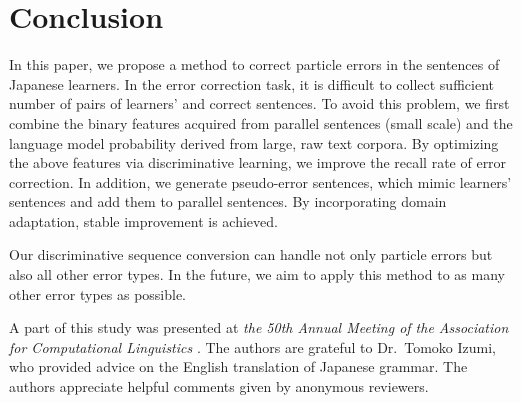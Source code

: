 \documentclass[english]{jnlp_1.4_rep}
\begin{document}
\section{Conclusion}
\label{sec-conclusion}

In this paper, we propose a method to correct particle errors in the
sentences of Japanese learners. In the error correction task, it is
difficult to collect sufficient number of pairs of learners' and
correct sentences. To avoid this problem, we first combine the binary
features acquired from parallel sentences (small scale) and the
language model probability derived from large, raw text corpora. By
optimizing the above features via discriminative learning, we improve
the recall rate of error correction. In addition, we generate
pseudo-error sentences, which mimic learners' sentences and add them
to parallel sentences. By incorporating domain adaptation, stable
improvement is achieved.


Our discriminative sequence conversion can handle not only particle
errors but also all other error types. In the future, we aim to apply
this method to as many other error types as possible.


\acknowledgment

A part of this study was presented at \textit{the 50th Annual Meeting
of the Association for Computational Linguistics}
\cite{imamura-EtAl:2012:ACL2012short}. The authors are grateful
to Dr.~Tomoko Izumi, who provided advice on the English translation of
Japanese grammar. The authors appreciate helpful comments given by
anonymous reviewers.
\end{document}
